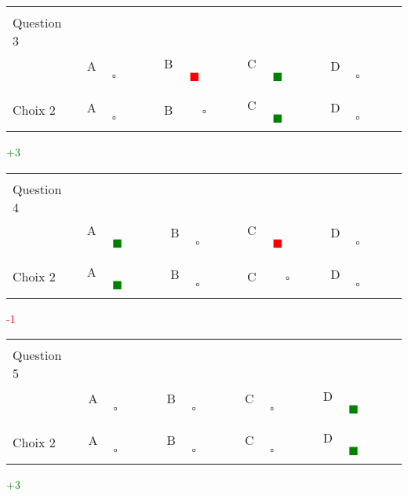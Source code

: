 \documentclass{book}%
\begin{document}
\begin{center}%
\begin{tabular}{| l  l  l  l  l |}%
\hline%
 & & & & \\%
Question 3\qquad \qquad\ & & & & \\%
& A $\qquad \square \qquad$& B \textcolor{red}{$\qquad \blacksquare \qquad$}& C \textcolor{green}{$\qquad \blacksquare \qquad$}& D $\qquad \square \qquad$\\%
 & & & & \\%
\hline%
 & & & &  \\%
Choix 2& A $\qquad \square \qquad$& B $\qquad \square \qquad$& C \textcolor{green}{$\qquad \blacksquare \qquad$}& D $\qquad \square \qquad$\\%
 & & & &  \\%
\hline%
\end{tabular}%
 \qquad  \textcolor{green}{+3}%
\\ \vskip3mm%
\end{center}%
\thispagestyle{empty}%
\begin{center}%
\begin{tabular}{| l  l  l  l  l |}%
\hline%
 & & & & \\%
Question 4\qquad \qquad\ & & & & \\%
& A \textcolor{green}{$\qquad \blacksquare \qquad$}& B $\qquad \square \qquad$& C \textcolor{red}{$\qquad \blacksquare \qquad$}& D $\qquad \square \qquad$\\%
 & & & & \\%
\hline%
 & & & &  \\%
Choix 2& A \textcolor{green}{$\qquad \blacksquare \qquad$}& B $\qquad \square \qquad$& C $\qquad \square \qquad$& D $\qquad \square \qquad$\\%
 & & & &  \\%
\hline%
\end{tabular}%
 \qquad  \textcolor{red}{-1}%
\\ \vskip3mm%
\end{center}%
\thispagestyle{empty}%
\begin{center}%
\begin{tabular}{| l  l  l  l  l |}%
\hline%
 & & & & \\%
Question 5\qquad \qquad\ & & & & \\%
& A $\qquad \square \qquad$& B $\qquad \square \qquad$& C $\qquad \square \qquad$& D \textcolor{green}{$\qquad \blacksquare \qquad$}\\%
 & & & & \\%
\hline%
 & & & &  \\%
Choix 2& A $\qquad \square \qquad$& B $\qquad \square \qquad$& C $\qquad \square \qquad$& D \textcolor{green}{$\qquad \blacksquare \qquad$}\\%
 & & & &  \\%
\hline%
\end{tabular}%
 \qquad  \textcolor{green}{+3}%
\\ \vskip3mm%
\end{center}%
\end{document}
